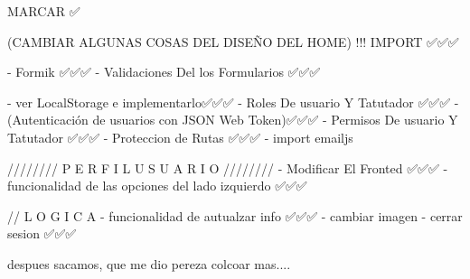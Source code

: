 
MARCAR ✅

(CAMBIAR ALGUNAS COSAS DEL DISEÑO DEL HOME) !!! IMPORT  ✅✅✅

    - Formik ✅✅✅
    - Validaciones Del los Formularios ✅✅✅

    - ver LocalStorage e implementarlo✅✅✅
    - Roles De usuario Y Tatutador ✅✅✅
    - (Autenticación de usuarios con JSON Web Token)✅✅✅
    - Permisos De usuario Y Tatutador ✅✅✅
    - Proteccion de Rutas ✅✅✅
    - import emailjs 



////////   P E R F I L   U S U A R I O   ////////  
    - Modificar El Fronted ✅✅✅
    - funcionalidad de las opciones del lado izquierdo ✅✅✅

    // L O G I C A
    - funcionalidad de autualzar info ✅✅✅
    - cambiar imagen
    - cerrar sesion ✅✅✅

despues sacamos, que me dio pereza colcoar mas....


